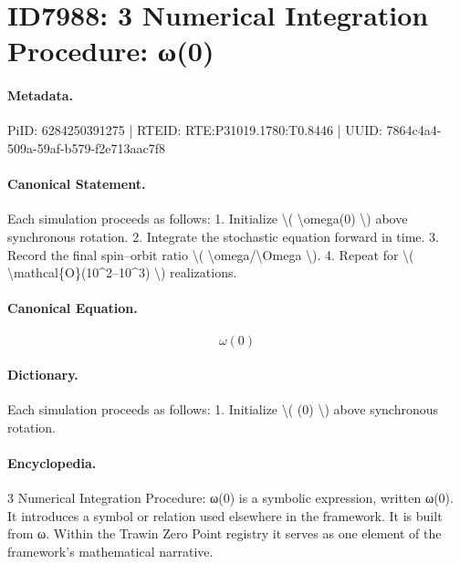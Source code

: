 \section*{ID7988: 3 Numerical Integration Procedure: ω(0)}
\paragraph{Metadata.}
PiID: 6284250391275 | RTEID: RTE:P31019.1780:T0.8446 | UUID: 7864c4a4-509a-59af-b579-f2e713aac7f8

\paragraph{Canonical Statement.}
Each simulation proceeds as follows: 1. Initialize \textbackslash{}( \textbackslash{}omega(0) \textbackslash{}) above synchronous rotation. 2. Integrate the stochastic equation forward in time. 3. Record the final spin–orbit ratio \textbackslash{}( \textbackslash{}omega/\textbackslash{}Omega \textbackslash{}). 4. Repeat for \textbackslash{}( \textbackslash{}mathcal\{O\}(10\textasciicircum{}2–10\textasciicircum{}3) \textbackslash{}) realizations.

\paragraph{Canonical Equation.}
\[
\omega(0)
\]

\paragraph{Dictionary.}
Each simulation proceeds as follows: 1. Initialize \textbackslash{}( (0) \textbackslash{}) above synchronous rotation.

\paragraph{Encyclopedia.}
3 Numerical Integration Procedure: ω(0) is a symbolic expression, written ω(0). It introduces a symbol or relation used elsewhere in the framework. It is built from ω. Within the Trawin Zero Point registry it serves as one element of the framework's mathematical narrative.
